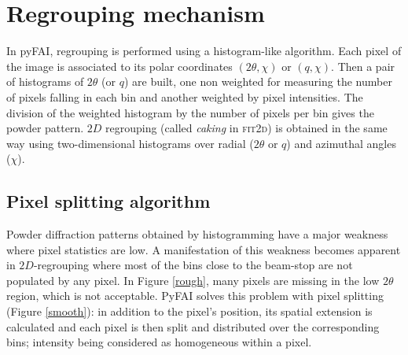 \documentclass[a4paper]{jpconf}
\begin{document}
\section{Regrouping mechanism}
In pyFAI, regrouping is performed using a histogram-like algorithm.
Each pixel of the image is associated to its polar coordinates
$(2\theta , \chi )$ or $(q, \chi )$. Then a pair of histograms of $2\theta$
(or $q$) are built, one non weighted for measuring the number of pixels falling in each bin and
another weighted by pixel intensities.
The division of the weighted histogram by the number of pixels per bin gives
the powder pattern.
$2D$ regrouping (called \textit{caking} in \textsc{fit2d}) is obtained in the
same way using two-dimensional histograms over radial ($2\theta$ or $q$) and azimuthal angles
($\chi$).

\subsection{Pixel splitting algorithm}
Powder diffraction patterns obtained by histogramming have a major weakness where
pixel statistics are low.
A manifestation of this weakness becomes apparent in $2D$-regrouping where most of
the bins close to the beam-stop are not populated by any pixel.
In Figure \ref{rough}, many pixels are missing in the low $2\theta$ region,
which is not acceptable. 
PyFAI solves this problem with pixel splitting (Figure \ref{smooth}): in 
addition to the pixel's position, its spatial extension is calculated and each
pixel is then split and distributed over the corresponding bins; intensity being
considered as homogeneous within a pixel.
\end{document}
